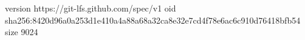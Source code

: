version https://git-lfs.github.com/spec/v1
oid sha256:8420d96a0a253d1e410a4a88a68a32ca8e32e7cd4f78e6ac6c910d76418bfb54
size 9024

